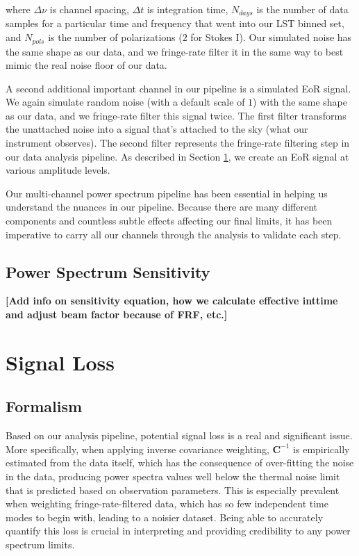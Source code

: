 \documentclass[preprint2,numberedappendix,tighten,twocolappendix]{aastex6}  %
\newcommand{\cc}[1]{{\color{purple} \textbf{[#1]}}}
\begin{document}
where $\Delta\nu$ is channel spacing, $\Delta t$ is integration time, $N_{days}$ is the number of data samples for a particular time and frequency that went into our LST binned set, and $N_{pols}$ is the number of polarizations ($2$ for Stokes I). Our simulated noise has the same shape as our data, and we fringe-rate filter it in the same way to best mimic the real noise floor of our data. 

A second additional important channel in our pipeline is a simulated EoR signal. We again simulate random noise (with a default scale of $1$) with the same shape as our data, and we fringe-rate filter this signal twice. The first filter transforms the unattached noise into a signal that's attached to the sky (what our instrument observes). The second filter represents the fringe-rate filtering step in our data analysis pipeline. As described in Section \ref{sec:Sigloss}, we create an EoR signal at various amplitude levels.

Our multi-channel power spectrum pipeline has been essential in helping us understand the nuances in our pipeline. Because there are many different components and countless subtle effects affecting our final limits, it has been imperative to carry all our channels through the analysis to validate each step.

\subsection{Power Spectrum Sensitivity}
\label{sec:PSSense}

\cc{Add info on sensitivity equation, how we calculate effective inttime and adjust beam factor because of FRF, etc.}

\section{Signal Loss}
\label{sec:Sigloss}

\subsection{Formalism}
\label{sec:Formalism}

Based on our analysis pipeline, potential signal loss is a real and significant issue. More specifically, when applying inverse covariance weighting, $\textbf{C}^{-1}$ is empirically estimated from the data itself, which has the consequence of over-fitting the noise in the data, producing power spectra values well below the thermal noise limit that is predicted based on observation parameters. This is especially prevalent when weighting fringe-rate-filtered data, which has so few independent time modes to begin with, leading to a noisier dataset. Being able to accurately quantify this loss is crucial in interpreting and providing credibility to any power spectrum limits. 
\end{document}

